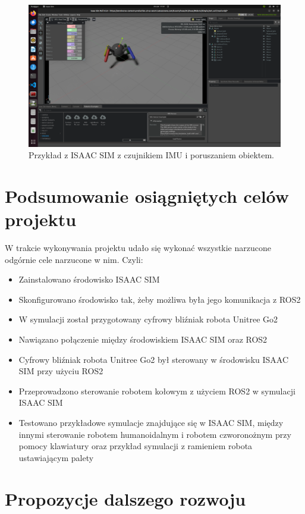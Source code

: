 \documentclass[12pt]{article}
\begin{document}
\begin{figure}
    \centering
    \includegraphics[width=0.7\linewidth]{Zdjęcia/poruszanieIMU.png}
    \caption{Przykład z ISAAC SIM z czujnikiem IMU i poruszaniem obiektem.}
    \label{ruchIMU}
\end{figure}

\clearpage

\section{Podsumowanie osiągniętych celów projektu}

W trakcie wykonywania projektu udało się wykonać wszystkie narzucone odgórnie cele narzucone w nim. Czyli:
\begin{itemize}
    \item Zainstalowano środowisko ISAAC SIM
    \item Skonfigurowano środowisko tak, żeby możliwa była jego komunikacja z ROS2
    \item W symulacji został przygotowany cyfrowy bliźniak robota Unitree Go2
    \item Nawiązano połączenie między środowiskiem ISAAC SIM oraz ROS2
    \item Cyfrowy bliźniak robota Unitree Go2 był sterowany w środowisku ISAAC SIM przy użyciu ROS2
    \item Przeprowadzono sterowanie robotem kołowym z użyciem ROS2 w symulacji ISAAC SIM
    \item Testowano przykładowe symulacje znajdujące się w ISAAC SIM, między innymi sterowanie robotem humanoidalnym i robotem czworonożnym przy pomocy klawiatury oraz przykład symulacji z ramieniem robota ustawiającym palety 
    
\end{itemize}

\section{Propozycje dalszego rozwoju}
\end{document}
